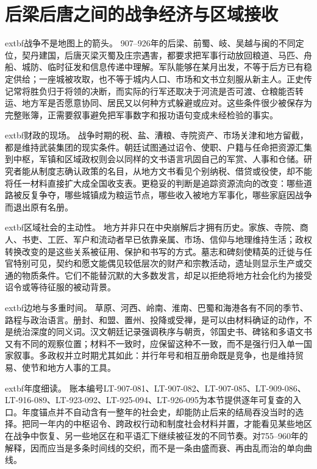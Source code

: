 \section{后梁后唐之间的战争经济与区域接收}
\label{sec:early-five-dynasties-war-economy}

\noindent	extbf{战争不是地图上的箭头。} 907--926年的后梁、前蜀、岐、吴越与闽的不同定位，契丹建国，后唐灭梁灭蜀及庄宗遇害，都要求把军事行动放回粮道、马匹、舟船、城防、临时征发和信息传递中理解。军队能够在某月出发，不等于后方已有稳定供给；一座城被攻取，也不等于城内人口、市场和文书立刻服从新主人。正史传记常将胜负归于将领的决断，而实际的行军还取决于河流是否可渡、仓粮能否转运、地方军是否愿意协同、居民又以何种方式躲避或应对。这些条件很少被保存为完整账簿，正需要叙事避免把军事数字和报功语句变成未经检验的事实。

\noindent	extbf{财政的现场。} 战争时期的税、盐、漕粮、寺院资产、市场关津和地方留截，都是维持武装集团的现实条件。朝廷试图通过诏令、使职、户籍与任命把资源汇集到中枢，军镇和区域政权则会以同样的文书语言巩固自己的军赏、人事和仓储。研究者能从制度志确认政策的名目，从地方文书看见个别纳税、借贷或役使，却不能将任一材料直接扩大成全国收支表。更稳妥的判断是追踪资源流向的改变：哪些道路被反复争夺，哪些城镇成为粮运节点，哪些收入被地方军事化，哪些家庭因战争而退出原有名册。

\noindent	extbf{区域社会的主动性。} 地方并非只在中央崩解后才拥有历史。家族、寺院、商人、书吏、工匠、军户和流动者早已依靠亲属、市场、信仰与地理维持生活；政权转换改变的是这些关系被征用、保护和书写的方式。墓志和碑刻使精英的迁徙与任官特别可见，契约和愿文能偶见较低层次的财产和宗教活动，遗址则显示生产或交通的物质条件。它们不能替沉默的大多数发言，却足以拒绝将地方社会化约为接受诏令或等待征服的被动背景。

\noindent	extbf{边地与多重时间。} 草原、河西、岭南、淮南、巴蜀和海港各有不同的季节、路程与政治语言。册封、和盟、置州、投降或受禅，是可以由材料确证的动作，不是统治深度的同义词。汉文朝廷记录强调秩序与朝贡，邻国史书、碑铭和多语文书又有不同的观察位置；材料不一致时，应保留这种不一致，而不是强行归入单一国家叙事。多政权并立时期尤其如此：并行年号和相互册命既是竞争，也是维持贸易、使节和地方人事的工具。

\noindent	extbf{年度细读。} 账本编号LT-907-081、LT-907-082、LT-907-085、LT-909-086、LT-916-089、LT-923-092、LT-925-094、LT-926-095为本节提供逐年可复查的入口。年度锚点并不自动含有一整年的社会史，却能防止后来的结局吞没当时的选择。把同一年内的中枢诏令、跨政权行动和制度社会材料并置，才能看见某些地区在战争中恢复、另一些地区在和平语汇下继续被征发的不同节奏。对755--960年的解释，因而应当是多条时间线的交织，而不是一条由盛而衰、再由乱而治的单向曲线。

